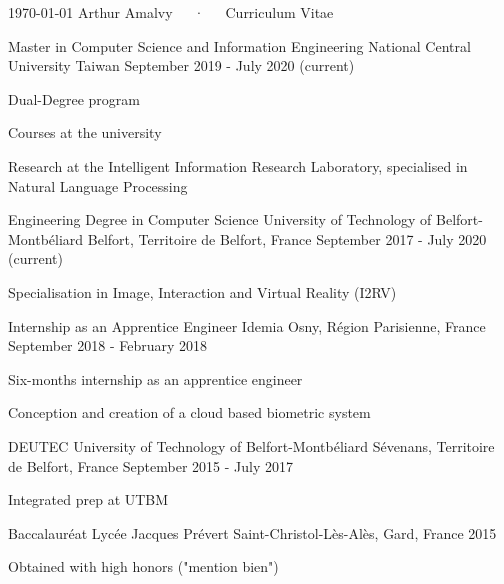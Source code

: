 \documentclass[11pt, a4paper]{awesome-cv}
\begin{document}
\makecvheader

\makecvfooter
  {\today}
  {Arthur Amalvy~~~·~~~Curriculum Vitae}
  {\thepage}



\begin{cventries}

  \cventry
  {Master in Computer Science and Information Engineering} %
  {National Central University} %
  {Taiwan} %
  {September 2019 - July 2020 (current)} %
  {
    \begin{cvitems} %
      \item Dual-Degree program
      \item Courses at the university 
      \item Research at the Intelligent Information Research Laboratory, specialised in Natural Language Processing
    \end{cvitems}
  }

  \cventry
  {Engineering Degree in Computer Science}
  {University of Technology of Belfort-Montbéliard}
  {Belfort, Territoire de Belfort, France}
  {September 2017 - July 2020 (current)}
  {
    \begin{cvitems}
      \item Specialisation in Image, Interaction and Virtual Reality (I2RV)
    \end{cvitems}
  }

  \cventry
  {Internship as an Apprentice Engineer}
  {Idemia}
  {Osny, Région Parisienne, France}
  {September 2018 - February 2018}
  {
    \begin{cvitems}
      \item Six-months internship as an apprentice engineer
      \item Conception and creation of a cloud based biometric system
    \end{cvitems}
  }

  \cventry
  {DEUTEC}
  {University of Technology of Belfort-Montbéliard}
  {Sévenans, Territoire de Belfort, France}
  {September 2015 - July 2017}
  {
    \begin{cvitems}
      \item Integrated prep at UTBM
    \end{cvitems}
  }

  \cventry
  {Baccalauréat}
  {Lycée Jacques Prévert}
  {Saint-Christol-Lès-Alès, Gard, France}
  {2015}
  {
    \begin{cvitems}
      \item Obtained with high honors ("mention bien")
    \end{cvitems}
  }

\end{cventries}
\end{document}
